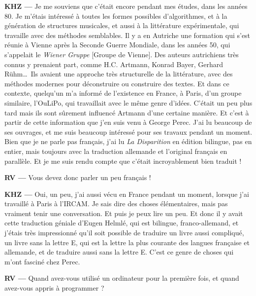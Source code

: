 \documentclass[a4paper,12pt]{article}
\begin{document}
\textbf{KHZ ---} Je me souviens que c'était encore pendant mes études, dans les années 80. Je m'étais intéressé à toutes les formes possibles d'algorithmes, et à la génération de structures musicales, et aussi à la littérature expérimentale, qui travaille avec des méthodes semblables. Il y a en Autriche une formation qui s'est réunie à Vienne après la Seconde Guerre Mondiale, dans les années 50, qui s'appelait le \emph{Wiener Gruppe} [Groupe de Vienne]. Des auteurs autrichiens très connus y prenaient part, comme H.C. Artmann, Konrad Bayer, Gerhard Rühm\dots~Ils avaient une approche très structurelle de la littérature, avec des méthodes modernes pour déconstruire ou construire des textes. Et dans ce contexte, quelqu'un m'a informé de l'existence en France, à Paris, d'un groupe similaire, l'OuLiPo, qui travaillait avec le même genre d'idées. C'était un peu plus tard mais ils sont sûrement influencé Artmann d'une certaine manière. Et c'est à partir de cette information que j'en suis venu à George Perec. J'ai lu beaucoup de ses ouvrages, et me suis beaucoup intéressé pour ses travaux pendant un moment. Bien que je ne parle pas français, j'ai lu \emph{La Disparition} en édition bilingue, pas en entier, mais toujours avec la traduction allemande et l'original français en parallèle. Et je me suis rendu compte que c'était incroyablement bien traduit !

\textbf{RV ---} Vous devez donc parler un peu français !

\textbf{KHZ ---} Oui, un peu, j'ai aussi vécu en France pendant un moment, lorsque j'ai travaillé à Paris à l'IRCAM. Je sais dire des choses élémentaires, mais pas vraiment tenir une conversation. Et puis je peux lire un peu. Et donc il y avait cette traduction géniale d'Eugen Helmlé, qui est bilingue, franco-allemand, et j'étais très impressionné qu'il soit possible de traduire un livre aussi compliqué, un livre sans la lettre E, qui est la lettre la plus courante des langues française et allemande, et de traduire aussi sans la lettre E. C'est ce genre de choses qui m'ont fasciné chez Perec.

\textbf{RV ---} Quand avez-vous utilisé un ordinateur pour la première fois, et quand avez-vous appris à programmer ?
\end{document}
